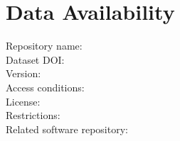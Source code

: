 \section{Data Availability}
\label{sec:data_availability}

Repository name: \\
Dataset DOI: \\
Version: \\
Access conditions: \\
License: \\
Restrictions: \\
Related software repository: \\


